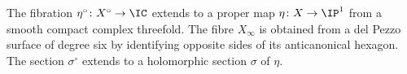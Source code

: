 \begin{prop}\label{prop: compactification X}
The fibration $\eta^\circ\colon X^\circ\to\IC$ extends to a proper
map $\eta\colon X\to\IP^1$ from a smooth compact complex threefold.
The fibre $X_\infty$ is obtained from a del Pezzo surface of degree six
by identifying opposite sides of its anticanonical hexagon.  The
section $\sigma^\circ$ extends to a holomorphic section $\sigma$ of
$\eta$.
\end{prop}
